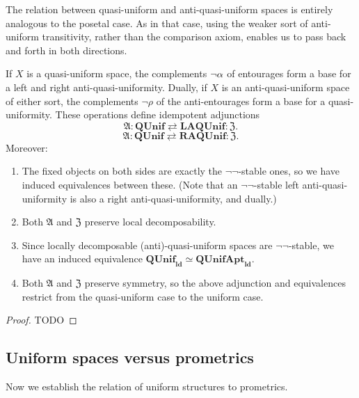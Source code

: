 \documentclass{article}
\let\implies\Rightarrow
\def\anti{\mathfrak{A}}
\def\neigh{\mathfrak{Z}}
\def\nn{\ensuremath{\neg\neg}}
\def\QUnif{\mathbf{QUnif}}
\def\QUnifnn{\mathbf{QUnif}_{\nn}}
\def\ldQUnif{\mathbf{QUnif}_{\mathbf{ld}}}
\def\AQUnifnn{\mathbf{AQUnif}_{\nn}}
\def\LAQUnif{\mathbf{LAQUnif}}
\def\RAQUnif{\mathbf{RAQUnif}}
\def\ldQUnifApt{\mathbf{QUnifApt}_{\mathbf{ld}}}
\begin{document}
The relation between quasi-uniform and anti-quasi-uniform spaces is entirely analogous to the posetal case.
As in that case, using the weaker sort of anti-uniform transitivity, rather than the comparison axiom, enables us to pass back and forth in both directions.

\begin{thm}\label{thm:qunif-aqunif}
  If $X$ is a quasi-uniform space, the complements $\neg\alpha$ of entourages form a base for a left and right anti-quasi-uniformity.
  Dually, if $X$ is an anti-quasi-uniform space of either sort, the complements $\neg\rho$ of the anti-entourages form a base for a quasi-uniformity.
  These operations define idempotent adjunctions
  \[ \anti : \QUnif \rightleftarrows \LAQUnif : \neigh. \]
  \[ \anti : \QUnif \rightleftarrows \RAQUnif : \neigh. \]
  Moreover:
  \begin{enumerate}
  \item The fixed objects on both sides are exactly the \nn-stable ones, so we have induced equivalences between these.
    (Note that an \nn-stable left anti-quasi-uniformity is also a right anti-quasi-uniformity, and dually.) 
  \item Both $\anti$ and $\neigh$ preserve local decomposability.
  \item Since locally decomposable (anti)-quasi-uniform spaces are \nn-stable, we have an induced equivalence $\ldQUnif \simeq \ldQUnifApt$.
  \item Both $\anti$ and $\neigh$ preserve symmetry, so the above adjunction and equivalences restrict from the quasi-uniform case to the uniform case.
  \end{enumerate}
\end{thm}
\begin{proof}
  TODO
\end{proof}

\subsection{Uniform spaces versus prometrics}
\label{sec:unif-pmet}

Now we establish the relation of uniform structures to prometrics.
\end{document}
